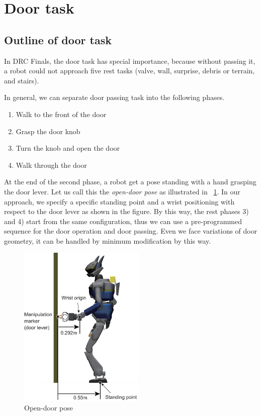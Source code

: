 \section{Door task}
	\label{sub:door}

\subsection{Outline of door task}
%
In DRC Finals, the door task has special importance, because without passing it, a robot could not approach five rest tasks (valve, wall, surprise, debris or terrain, and stairs).
   
In general, we can separate door passing task into the following phases.
%
\begin{enumerate}
\item Walk to the front of the door 
\item Grasp the door knob
\item Turn the knob and open the door
\item Walk through the door
\end{enumerate}
%

%

At the end of the second phase, a robot get a pose standing with a hand grasping 
the door lever. Let us call this the {\it open-door pose} as illustrated in \figurename~\ref{fig:door_approaching_config}.
In our approach, we specify a specific standing point and a wrist positioning with respect to 
the door lever as shown in the figure.
By this way, the rest phases 3) and 4) start from the same configuration, thus we can 
use a pre-programmed sequence for the door operation and door passing.
Even we face variations of door geometry, it can be handled by minimum modification by this way.

\begin{figure}[t]
  \centering
  \includegraphics[width = 6cm]{img/door_approaching_config}
  \caption{Open-door pose}
  \label{fig:door_approaching_config}
\end{figure}

